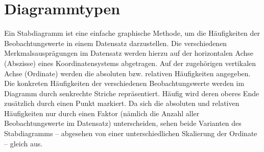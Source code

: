 \documentclass{lecture}
\begin{document}
    \section*{Diagrammtypen}

    Ein Stabdiagramm ist eine einfache graphische Methode, um die Häufigkeiten der Beobachtungswerte in einem Datensatz darzustellen.
    Die verschiedenen Merkmalsausprägungen im Datensatz werden hierzu auf der horizontalen Achse (Abszisse) eines Koordinatensystems abgetragen.
    Auf der zugehörigen vertikalen Achse (Ordinate) werden die absoluten bzw. relativen Häufigkeiten angegeben.
    Die konkreten Häufigkeiten der verschiedenen Beobachtungswerte werden im Diagramm durch senkrechte Striche repräsentiert.
    Häufig wird deren oberes Ende zusätzlich durch einen Punkt markiert.
    Da sich die absoluten und relativen Häufigkeiten nur durch einen Faktor (nämlich die Anzahl aller Beobachtungswerte im Datensatz) unterscheiden, sehen beide Varianten des Stabdiagramms -- abgesehen von einer unterschiedlichen Skalierung der Ordinate -- gleich aus.
\end{document}
